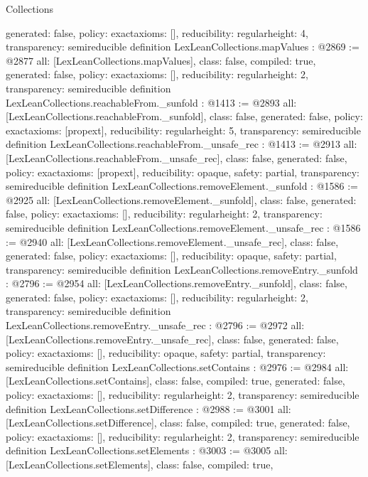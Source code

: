 \begin{lexlean}{Collections}
\begin{coremodule}
{  generated: false,
  policy: exact{axioms: []},
  reducibility: regular{height: 4},
  transparency: semireducible
}
definition LexLeanCollections.mapValues : @2869 := @2877 {
  all: [LexLeanCollections.mapValues],
  class: false,
  compiled: true,
  generated: false,
  policy: exact{axioms: []},
  reducibility: regular{height: 2},
  transparency: semireducible
}
definition LexLeanCollections.reachableFrom._sunfold : @1413 := @2893 {
  all: [LexLeanCollections.reachableFrom._sunfold],
  class: false,
  generated: false,
  policy: exact{axioms: [propext]},
  reducibility: regular{height: 5},
  transparency: semireducible
}
definition LexLeanCollections.reachableFrom._unsafe_rec : @1413 := @2913 {
  all: [LexLeanCollections.reachableFrom._unsafe_rec],
  class: false,
  generated: false,
  policy: exact{axioms: [propext]},
  reducibility: opaque{},
  safety: partial,
  transparency: semireducible
}
definition LexLeanCollections.removeElement._sunfold : @1586 := @2925 {
  all: [LexLeanCollections.removeElement._sunfold],
  class: false,
  generated: false,
  policy: exact{axioms: []},
  reducibility: regular{height: 2},
  transparency: semireducible
}
definition LexLeanCollections.removeElement._unsafe_rec : @1586 := @2940 {
  all: [LexLeanCollections.removeElement._unsafe_rec],
  class: false,
  generated: false,
  policy: exact{axioms: []},
  reducibility: opaque{},
  safety: partial,
  transparency: semireducible
}
definition LexLeanCollections.removeEntry._sunfold : @2796 := @2954 {
  all: [LexLeanCollections.removeEntry._sunfold],
  class: false,
  generated: false,
  policy: exact{axioms: []},
  reducibility: regular{height: 2},
  transparency: semireducible
}
definition LexLeanCollections.removeEntry._unsafe_rec : @2796 := @2972 {
  all: [LexLeanCollections.removeEntry._unsafe_rec],
  class: false,
  generated: false,
  policy: exact{axioms: []},
  reducibility: opaque{},
  safety: partial,
  transparency: semireducible
}
definition LexLeanCollections.setContains : @2976 := @2984 {
  all: [LexLeanCollections.setContains],
  class: false,
  compiled: true,
  generated: false,
  policy: exact{axioms: []},
  reducibility: regular{height: 2},
  transparency: semireducible
}
definition LexLeanCollections.setDifference : @2988 := @3001 {
  all: [LexLeanCollections.setDifference],
  class: false,
  compiled: true,
  generated: false,
  policy: exact{axioms: []},
  reducibility: regular{height: 2},
  transparency: semireducible
}
definition LexLeanCollections.setElements : @3003 := @3005 {
  all: [LexLeanCollections.setElements],
  class: false,
  compiled: true,
}
\end{coremodule}
\end{lexlean}

